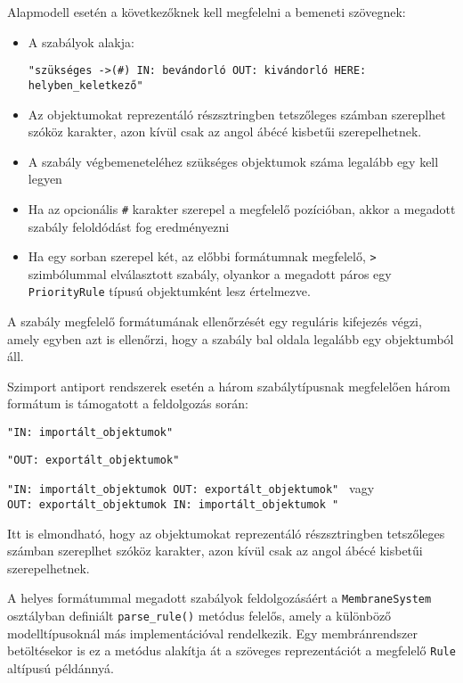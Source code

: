 Alapmodell esetén a következőknek kell megfelelni a bemeneti szövegnek:
\begin{itemize}
\item  A szabályok alakja: \\
\begin{small}
\verb|"szükséges ->(#) IN: bevándorló OUT: kivándorló HERE: helyben_keletkező"|
\end{small} 
\item Az objektumokat reprezentáló részsztringben tetszőleges számban szereplhet szóköz karakter, azon kívül csak az angol ábécé kisbetűi szerepelhetnek.
\item A szabály végbemeneteléhez szükséges objektumok száma legalább egy kell legyen
\item Ha az opcionális \verb|#| karakter szerepel a megfelelő pozícióban, akkor a megadott szabály feloldódást fog eredményezni
\item Ha egy sorban szerepel két, az előbbi formátumnak megfelelő, \verb|>| szimbólummal elválasztott szabály, olyankor a megadott páros egy \verb|PriorityRule| típusú objektumként lesz értelmezve. 
\end{itemize}

A szabály megfelelő formátumának ellenőrzését egy reguláris kifejezés végzi, amely egyben azt is ellenőrzi, hogy a szabály bal oldala legalább egy objektumból áll.

Szimport antiport rendszerek esetén a három szabálytípusnak megfelelően három formátum is támogatott a feldolgozás során:
\begin{compactenum}
\item \verb|"IN: importált_objektumok"|
\item \verb|"OUT: exportált_objektumok"|
\item 
\begin{small}
\verb|"IN: importált_objektumok OUT: exportált_objektumok" | vagy \\ \verb|OUT: exportált_objektumok IN: importált_objektumok "|
\end{small}
\end{compactenum}

Itt is elmondható, hogy az objektumokat reprezentáló részsztringben tetszőleges számban szereplhet szóköz karakter, azon kívül csak az angol ábécé kisbetűi szerepelhetnek.

A helyes formátummal megadott szabályok feldolgozásáért a \verb|MembraneSystem| osztályban definiált \verb|parse_rule()| metódus felelős, amely a különböző modelltípusoknál más implementációval rendelkezik. Egy membránrendszer betöltésekor is ez a metódus alakítja át a szöveges reprezentációt a megfelelő \verb|Rule| altípusú példánnyá.

